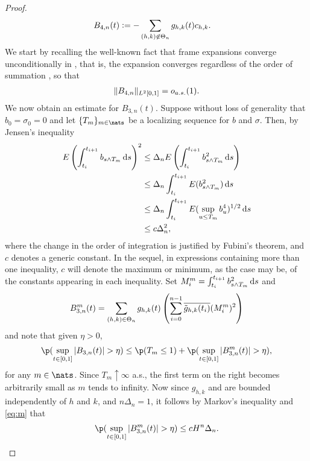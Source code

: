 \begin{proof}
\begin{align}
  &B_{4,n}(t) := - \sum_{\substack{(h,k) \not\in \Theta_n }}g_{h,k}(t){c}_{h,k}. 
  \label{}
\end{align}
We start by recalling the well-known fact that  frame expansions converge unconditionally in \Ltwo, that is, the expansion converges regardless of the order of summation \citep[Theorem 5.1.7]{Christensen2008}, so that  
\begin{align}
  \Vert B_{4, n}  \Vert_{L^2[0,1]} = o_{a.s.}(1).\notag
  \label{}
\end{align}
We now obtain an estimate for  $B_{3,n}(t)$. Suppose without loss of generality that $b_0 = \sigma_0 =  0$ and let $\{T_m\}_{m \in \nats}$ be a localizing sequence for $b$ and $\sigma$.  Then, by Jensen's inequality
\begin{align}
 E\left(\int_{t_i}^{t_{i+1}} b_{s \wedge T_m}  \D s\right)^2  &\le \Delta_n E\left(\int_{t_i}^{t_{i+1}} b_{s \wedge T_m}^2  \D s\right) \notag \\
&\le \Delta_n \int_{t_i}^{t_{i+1}} E(b_{s \wedge T_m}^2)  \D s \notag\\
&\le \Delta_n \int_{t_i}^{t_{i+1}} E(\sup_{u \le T_m}b_{u}^4)^{1/2}  \D s \notag\\
& \le c \Delta_n^2,
  \label{eq:m}
\end{align}
where the change in the order of integration is justified by Fubini's theorem, and $c$ denotes  a generic constant. In  the sequel, in expressions containing more than one inequality, $c$ will denote the maximum or minimum, as the case may be, of the constants appearing in each inequality.      Set $M_i^m = \int_{t_i}^{t_{i+1}} b_{s \wedge T_m}^2  \D s$ and 
\begin{align}
  B^m_{3,n}(t) = \sum_{(h,k) \in \Theta_n} g_{h,k}(t)\left( \sum_{i=0}^{n-1} \overline{\tilde{g}_{h,k}(t_i)} (M_i^m)^2 \right)\notag
  \label{}
\end{align}
and note that given $\eta > 0$,
\begin{align}
 \p(\sup_{t \in \domain} \vert B_{3,n}(t)\vert >  \eta ) \le \p(T_m \le 1) + \p( \sup_{t \in \domain} \vert B_{3,n}^m(t)\vert > \eta), \notag
  \label{}
\end{align}
for any $m \in \nats$. Since $T_m \uparrow \infty$ a.s., the first term on the right becomes arbitrarily small as $m$ tends to infinity. Now since  $g_{h,k}$ and \tghk  are bounded independently of $h$ and $k$, and $n\Delta_n = 1$, it follows by Markov's inequality and \eqref{eq:m} that 
\begin{align}
  \p( \sup_{t \in \domain} \vert B_{3,n}^m(t)\vert > \eta) \le  c H^n \Delta_n.  \notag

\end{align}
\end{proof}
